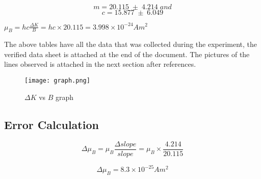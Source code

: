 	\vspace{-5mm}
	$$m = 20.115\;\pm\;4.214\;and$$ 
	$$c = 15.877\;\pm\;6.049$$
	

	$\mu_B = hc\frac{\Delta K}{B} = hc \times 20.115 = 3.998 \times 10^{-24} Am^2$
	
	\vspace{4mm}
	The above tables have all the data that was collected during the experiment, the verified data sheet is attached at the end of the document. The pictures of the lines observed is attached in the next section after references.

	\begin{figure}[H]
		\centering
		\texttt{[image: graph.png]}
		\caption{$\Delta K$ vs $B$ graph}
		\label{fig:graph}
	\end{figure}
\subsection{Error Calculation}

    $$\Delta \mu_B = \mu_B \frac{\Delta slope}{slope} = \mu_B \times \frac{4.214}{20.115}$$

    $$\Delta \mu_B = 8.3 \times 10^{-25} Am^2$$